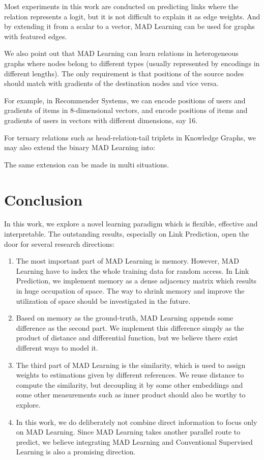 \documentclass{article}
\begin{document}
Most experiments in this work are conducted on predicting links where
the relation  represents a logit, but it is not difficult to explain
it as edge weights.
And by extending it from a scalar to a vector, MAD Learning can be used
for graphs with featured edges.

We also point out that MAD Learning can learn relations in heterogeneous
graphs where nodes belong to different types (usually represented by
encodings in different lengths). The only requirement is that positions
of the source nodes should match with gradients of the destination nodes
and vice versa.

For example, in Recommender Systems, we can encode positions of users
and gradients of items in 8-dimensional vectors, and encode positions of
items and gradients of users in vectors with different dimensions, say
16.

For ternary relations such as head-relation-tail triplets 
in Knowledge Graphs, we may also extend the binary MAD Learning into:

The same extension can be made in multi situations.

\hypertarget{conclusion}{\section{Conclusion}\label{sec:conclusion}}

In this work, we explore a novel learning paradigm which is flexible,
effective and interpretable.
The outstanding results, especially on Link Prediction, open the door
for several research directions:

\begin{enumerate}
\item
  The most important part of MAD Learning is memory. However, MAD
  Learning have to index the whole training data for random access. In
  Link Prediction, we implement memory as a dense adjacency matrix which
  results in huge occupation of space. The way to shrink memory and
  improve the utilization of space should be investigated in the future.
\item
Based on memory as the ground-truth, MAD Learning appends some difference as the second part. We implement this difference simply as the product of distance and differential function, but we believe there exist different ways to model it.
\item
  The third part of MAD Learning is the similarity, which is used to assign weights to estimations given by different references. We reuse distance to compute the similarity, but decoupling it by some other embeddings and some other measurements such as inner product should also be worthy to explore.
\item
  In this work, we do deliberately not combine direct information to
  focus only on MAD Learning. Since MAD Learning takes another parallel
  route to predict, we believe integrating MAD Learning and Conventional
  Supervised Learning is also a promising direction.
\end{enumerate}



\end{document}
